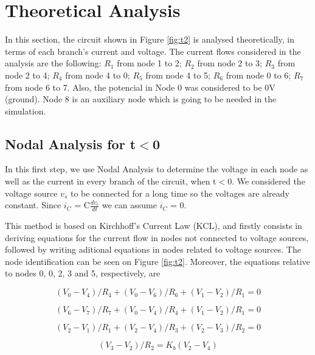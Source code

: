 \section{Theoretical Analysis}
\label{sec:analysis}

In this section, the circuit shown in Figure \ref{fig:t2} is analysed
theoretically, in terms of each branch's current and voltage.
The current flows considered in the analysis are the following:
$R_1$ from node 1 to 2; $R_2$ from node 2 to 3; $R_3$ from node 2 to 4; $R_4$ from node 4 to 0; $R_5$ from node 4 to 5; $R_6$ from node 0 to 6; $R_7$ from node 6 to 7. Also, the potencial in Node 0 was considered to be 0V (ground). Node 8 is an auxiliary node which is going to be needed in the simulation.

\subsection{Nodal Analysis for t$<$0}
\label{sec:na}

In this first step, we use Nodal Analysis to determine the voltage in each node as well as the current in every branch of the circuit, when t$<$0. We considered the voltage source $v_s$ to be connected for a long time so the voltages are already constant. Since $i_C$ = C$\frac{dv_c}{dt}$ we can assume $i_C$ = 0. \par 
This method is based on Kirchhoff's Current Law (KCL), and firstly consists in
deriving equations for the current flow in nodes not connected to voltage sources,
followed by writing aditional equations in nodes related to voltage sources. The node 
identification can be seen on Figure \ref{fig:t2}. Moreover, the equations relative to
nodes 0, 0, 2, 3 and 5, respectively, are

\begin{equation}
  (V_0 - V_4)/R_4 + (V_0 - V_6)/R_6 + (V_1 - V_2)/R_1 = 0 
  \label{eq:kvl1}
\end{equation}

\begin{equation}
  (V_6 - V_7)/R_7 + (V_0 - V_4)/R_4 + (V_1 - V_2)/R_1 = 0 
  \label{eq:kvl2}
\end{equation}

\begin{equation}
  (V_2 - V_1)/R_1 + (V_2 - V_4)/R_3 + (V_2 - V_3)/R_2 = 0
  \label{eq:kvl3}
\end{equation}

\begin{equation}
  (V_3 - V_2)/R_2 = K_b(V_2 - V_4)
  \label{eq:kvl4}
\end{equation}

